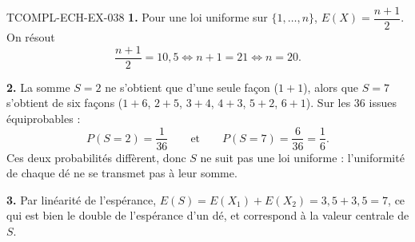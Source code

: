 \begin{corrige}{TCOMPL-ECH-EX-038}
\textbf{1.} Pour une loi uniforme sur $\{1,\ldots,n\}$, $E(X)=\dfrac{n+1}{2}$. On résout
\[
  \frac{n+1}{2} = 10{,}5 \iff n+1 = 21 \iff n = 20 .
\]

\textbf{2.} La somme $S=2$ ne s'obtient que d'une seule façon ($1+1$), alors que $S=7$ s'obtient de six façons ($1+6$, $2+5$, $3+4$, $4+3$, $5+2$, $6+1$). Sur les $36$ issues équiprobables :
\[
  P(S=2) = \frac{1}{36} \qquad \text{et} \qquad P(S=7) = \frac{6}{36} = \frac{1}{6}.
\]
Ces deux probabilités diffèrent, donc $S$ ne suit pas une loi uniforme : l'uniformité de chaque dé ne se transmet pas à leur somme.

\textbf{3.} Par linéarité de l'espérance, $E(S) = E(X_1)+E(X_2) = 3{,}5+3{,}5 = 7$, ce qui est bien le double de l'espérance d'un dé, et correspond à la valeur centrale de $S$.
\end{corrige}
